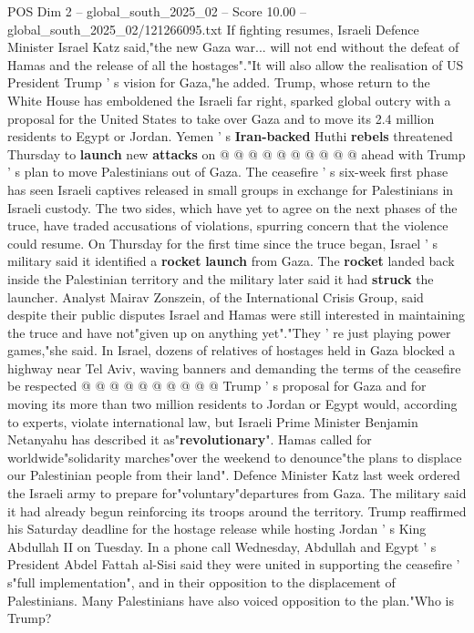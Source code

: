 \begin{textsample}{POS Dim 2 – global\_south\_2025\_02 – Score 10.00 – global\_south\_2025\_02/121266095.txt}
If fighting resumes, Israeli Defence Minister Israel Katz said,"the new Gaza war... will not end without the defeat of Hamas and the release of all the hostages"."It will also allow the realisation of US President Trump ' s vision for Gaza,"he added.
Trump, whose return to the White House has emboldened the Israeli far right, sparked global outcry with a proposal for the United States to take over Gaza and to move its 2.4 million residents to Egypt or Jordan.
Yemen ' s \textbf{Iran-backed} Huthi \textbf{rebels} threatened Thursday to \textbf{launch} new \textbf{attacks} on @ @ @ @ @ @ @ @ @ @ ahead with Trump ' s plan to move Palestinians out of Gaza.
The ceasefire ' s six-week first phase has seen Israeli captives released in small groups in exchange for Palestinians in Israeli custody.
The two sides, which have yet to agree on the next phases of the truce, have traded accusations of violations, spurring concern that the violence could resume.
On Thursday for the first time since the truce began, Israel ' s military said it identified a \textbf{rocket} \textbf{launch} from Gaza.
The \textbf{rocket} landed back inside the Palestinian territory and the military later said it had \textbf{struck} the launcher.
Analyst Mairav Zonszein, of the International Crisis Group, said despite their public disputes Israel and Hamas were still interested in maintaining the truce and have not"given up on anything yet"."They ' re just playing power games,"she said.
In Israel, dozens of relatives of hostages held in Gaza blocked a highway near Tel Aviv, waving banners and demanding the terms of the ceasefire be respected @ @ @ @ @ @ @ @ @ @ Trump ' s proposal for Gaza and for moving its more than two million residents to Jordan or Egypt would, according to experts, violate international law, but Israeli Prime Minister Benjamin Netanyahu has described it as"\textbf{revolutionary}".
Hamas called for worldwide"solidarity marches"over the weekend to denounce"the plans to displace our Palestinian people from their land".
Defence Minister Katz last week ordered the Israeli army to prepare for"voluntary"departures from Gaza.
The military said it had already begun reinforcing its troops around the territory.
Trump reaffirmed his Saturday deadline for the hostage release while hosting Jordan ' s King Abdullah II on Tuesday.
In a phone call Wednesday, Abdullah and Egypt ' s President Abdel Fattah al-Sisi said they were united in supporting the ceasefire ' s"full implementation", and in their opposition to the displacement of Palestinians.
Many Palestinians have also voiced opposition to the plan."Who is Trump?

\end{textsample}
